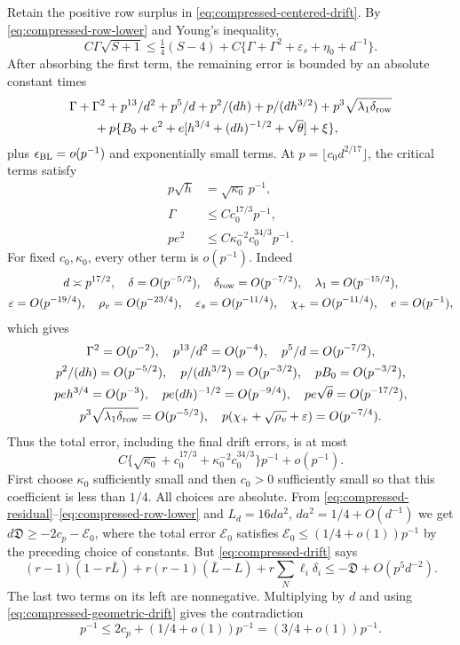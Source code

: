 \documentclass[10pt]{article}
\numberwithin{equation}{section}
\newcommand{\1}{\mathbf1}
\begin{document}
Retain the positive row surplus in \eqref{eq:compressed-centered-drift}.
By \eqref{eq:compressed-row-lower} and Young's inequality,
\[
 C\Gamma\sqrt{S+1}\le\tfrac14(S-4)
 +C\{\Gamma+\Gamma^2+\varepsilon_s+\eta_0+d^{-1}\}.
\]
After absorbing the first term, the remaining error is bounded by
an absolute constant times
\[
 \begin{split}
 &\Gamma+\Gamma^2+p^{13}/d^2+p^5/d+p^2/(dh)+p/(dh^{3/2})
                  +p^3\sqrt{\lambda_1\delta_{\rm row}}\\
 &\qquad+p\{B_0+e^2+e[h^{3/4}+(dh)^{-1/2}+\sqrt\theta]+\xi\},
 \end{split}
\]
plus $\epsilon_{\rm BL}=o(p^{-1})$ and exponentially small terms.
At $p=\lfloor c_0d^{2/17}\rfloor$, the critical terms satisfy
\[
 \begin{aligned}
 p\sqrt h&=\sqrt{\kappa_0}\,p^{-1},\\
 \Gamma&\le Cc_0^{17/3}p^{-1},\\
 pe^2&\le C\kappa_0^{-2}c_0^{34/3}p^{-1}.
 \end{aligned}\tag{D16}\label{eq:compressed-ledger}
\]
For fixed $c_0,\kappa_0$, every other term is $o(p^{-1})$. Indeed
\[
 \begin{gathered}
 d\asymp p^{17/2},\quad\delta=O(p^{-5/2}),\quad
 \delta_{\rm row}=O(p^{-7/2}),\quad\lambda_1=O(p^{-15/2}),\\
 \varepsilon=O(p^{-19/4}),\quad\rho_v=O(p^{-23/4}),\quad
 \varepsilon_s=O(p^{-11/4}),\quad \chi_+=O(p^{-11/4}),\quad e=O(p^{-1}),
 \end{gathered}
\]
which gives
\[
 \begin{gathered}
 \Gamma^2=O(p^{-2}),\quad p^{13}/d^2=O(p^{-4}),\quad p^5/d=O(p^{-7/2}),\\
 p^2/(dh)=O(p^{-5/2}),\quad p/(dh^{3/2})=O(p^{-3/2}),\quad
 pB_0=O(p^{-3/2}),\\
 peh^{3/4}=O(p^{-3}),\quad pe(dh)^{-1/2}=O(p^{-9/4}),\quad
 pe\sqrt\theta=O(p^{-17/2}),\\
 p^3\sqrt{\lambda_1\delta_{\rm row}}=O(p^{-5/2}),\quad
 p(\chi_++\sqrt{\rho_v}+\varepsilon)=O(p^{-7/4}).
 \end{gathered}
\]
Thus the total error, including the final drift errors, is at most
\[
 C\{\sqrt{\kappa_0}+c_0^{17/3}
                 +\kappa_0^{-2}c_0^{34/3}\}p^{-1}+o(p^{-1}).
\]
First choose $\kappa_0$ sufficiently small and then $c_0>0$
sufficiently small so that this coefficient is less than $1/4$.
All choices are absolute.
From \eqref{eq:compressed-residual}--\eqref{eq:compressed-row-lower}
and $L_d=16da^2$, $da^2=1/4+O(d^{-1})$ we get
$d\mathfrak D\ge-2c_p-\mathcal E_0$, where the total error
$\mathcal E_0$ satisfies $\mathcal E_0\le(1/4+o(1))p^{-1}$
by the preceding choice of constants. But
\eqref{eq:compressed-drift} says
\[
 (r-1)(1-r\bar L)+r(r-1)(\bar L-L)
       +r\sum_N\ell_i\delta_i
       \le-\mathfrak D+O(p^5d^{-2}).
\]
The last two terms on its left are nonnegative. Multiplying by $d$
and using \eqref{eq:compressed-geometric-drift} gives the contradiction
\[
 p^{-1}\le 2c_p+(1/4+o(1))p^{-1}
                   =(3/4+o(1))p^{-1}.
\]
\end{document}
